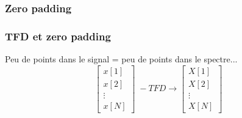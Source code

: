 \documentclass{beamer}
\begin{document}
\subsubsection{Zero padding}
\begin{frame}
\frametitle{TFD et zero padding}
Peu de points dans le signal = peu de points dans le spectre...\\

\vspace{0.1cm}
\[
\begin{bmatrix} x[1] \\ x[2] \\ \vdots \\ x[N] \end{bmatrix} \; -TFD \rightarrow  
\begin{bmatrix} X[1] \\ X[2] \\ \vdots \\ X[N] \end{bmatrix}
\]
\vspace{0.1cm}

\end{frame} 
\end{document}
